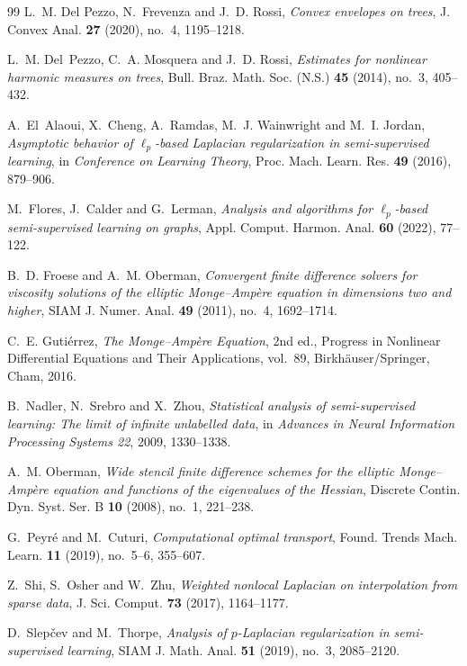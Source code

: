 \documentclass[reqno,11pt]{amsart}
\numberwithin{equation}{section}
\theoremstyle{definition}
\theoremstyle{remark}
\begin{document}
\begin{thebibliography}{99}
L.~M. Del Pezzo, N.~Frevenza and J.~D. Rossi, 
{\it Convex envelopes on trees},
J. Convex Anal. \textbf{27} (2020), no.~4, 1195--1218.

L.~M. Del~Pezzo, C.~A. Mosquera and J.~D. Rossi,
\emph{Estimates for nonlinear harmonic measures on trees},
Bull. Braz. Math. Soc. (N.S.) \textbf{45} (2014), no.~3, 405--432.

A.~El~Alaoui, X.~Cheng, A.~Ramdas, M.~J. Wainwright and M.~I. Jordan,
\emph{Asymptotic behavior of $\ell_p$-based Laplacian regularization in semi-supervised learning},
in \emph{Conference on Learning Theory},
Proc. Mach. Learn. Res. \textbf{49} (2016), 879--906.

M.~Flores, J.~Calder and G.~Lerman,
\emph{Analysis and algorithms for $\ell_p$-based semi-supervised learning on graphs},
Appl. Comput. Harmon. Anal. \textbf{60} (2022), 77--122.

B.~D. Froese and A.~M. Oberman,
\emph{Convergent finite difference solvers for viscosity solutions of the elliptic Monge--Amp\`ere equation in dimensions two and higher},
SIAM J. Numer. Anal. \textbf{49} (2011), no.~4, 1692--1714.

C.~E. Guti\'errez,
\emph{The Monge--Amp\`ere Equation},
2nd ed., Progress in Nonlinear Differential Equations and Their Applications, vol.~89,
Birkh\"auser/Springer, Cham, 2016.

B.~Nadler, N.~Srebro and X.~Zhou,
\emph{Statistical analysis of semi-supervised learning: The limit of infinite unlabelled data},
in \emph{Advances in Neural Information Processing Systems 22}, 2009, 1330--1338.

A.~M. Oberman,
\emph{Wide stencil finite difference schemes for the elliptic Monge--Amp\`ere equation and functions of the eigenvalues of the Hessian},
Discrete Contin. Dyn. Syst. Ser. B \textbf{10} (2008), no.~1, 221--238.

G.~Peyr\'e and M.~Cuturi,
\emph{Computational optimal transport},
Found. Trends Mach. Learn. \textbf{11} (2019), no.~5--6, 355--607.

Z.~Shi, S.~Osher and W.~Zhu,
\emph{Weighted nonlocal Laplacian on interpolation from sparse data},
J. Sci. Comput. \textbf{73} (2017), 1164--1177.

D.~Slep{\v c}ev and M.~Thorpe,
\emph{Analysis of $p$-Laplacian regularization in semi-supervised learning},
SIAM J. Math. Anal. \textbf{51} (2019), no.~3, 2085--2120.


\end{thebibliography}
\end{document}
